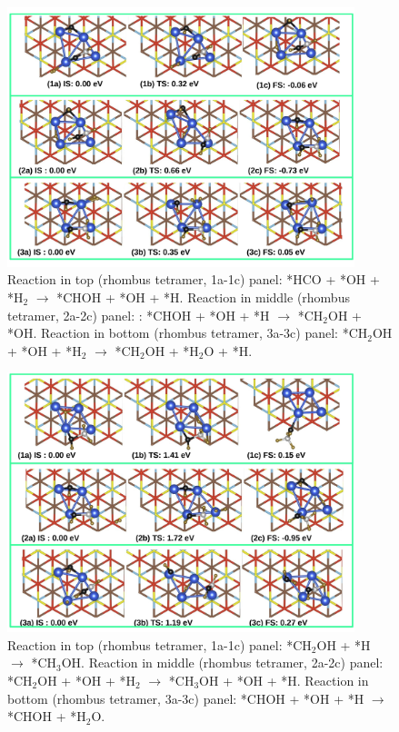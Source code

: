 \begin{figure}
  \begin{center}
    \includegraphics[width=0.9\textwidth]{./Appendix3/figures_si/p_110.jpg}
  \end{center}
    \caption{Reaction in top (rhombus tetramer, 1a-1c) panel: *HCO + *OH + *H$_2$ $\rightarrow$ *CHOH + *OH + *H. Reaction in middle (rhombus tetramer, 2a-2c) panel: : *CHOH  + *OH + *H $\rightarrow$ *CH$_2$OH + *OH. Reaction in bottom (rhombus tetramer, 3a-3c) panel: *CH$_2$OH  + *OH + *H$_2$ $\rightarrow$ *CH$_2$OH + *H$_2$O + *H. }
  \label{fig:si-110}
\end{figure}

\begin{figure}
  \begin{center}
    \includegraphics[width=0.9\textwidth]{./Appendix3/figures_si/p_111.jpg}
  \end{center}
    \caption{ Reaction in top (rhombus tetramer, 1a-1c) panel: *CH$_2$OH + *H $\rightarrow$ *CH$_3$OH. Reaction in middle (rhombus tetramer, 2a-2c) panel: *CH$_2$OH + *OH + *H$_2$ $\rightarrow$ *CH$_3$OH + *OH + *H. Reaction in bottom (rhombus tetramer, 3a-3c) panel: *CHOH + *OH + *H $\rightarrow$ *CHOH + *H$_2$O.   }
  \label{fig:si-111}
\end{figure}

